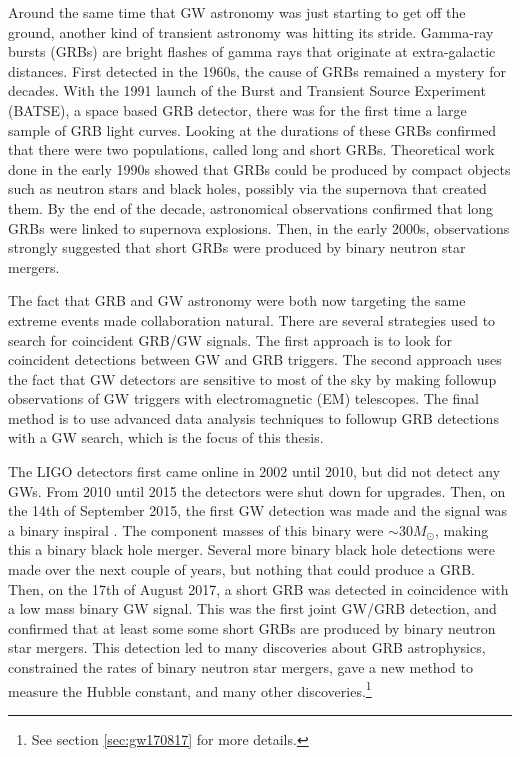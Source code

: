 \documentclass[11pt]{cuthesis}
\begin{document}
Around the same time that GW astronomy was just starting to get off the ground, another kind of transient astronomy was hitting its stride. Gamma-ray bursts (GRBs) are bright flashes of gamma rays that originate at extra-galactic distances. First detected in the 1960s, the cause of GRBs remained a mystery for decades. With the 1991 launch of the Burst and Transient Source Experiment (BATSE), a space based GRB detector, there was for the first time a large sample of GRB light curves. Looking at the durations of these GRBs  confirmed that there were two populations, called long and short GRBs. Theoretical work done in the early 1990s showed that GRBs could be produced by compact objects such as neutron stars and black holes, possibly via the supernova that created them. By the end of the decade, astronomical observations confirmed that long GRBs were linked to supernova explosions. Then, in the early 2000s, observations strongly suggested that short GRBs were produced by binary neutron star mergers. 

The fact that GRB and GW astronomy were both now targeting the same extreme events made collaboration natural. There are several strategies used to search for coincident GRB/GW signals. The first approach is to look for coincident detections between GW and GRB triggers. The second approach uses the fact that GW detectors are sensitive to most of the sky by making followup observations of GW triggers with electromagnetic (EM) telescopes. The final method is to use advanced data analysis techniques to followup GRB detections with a GW search, which is the focus of this thesis. 

The LIGO detectors first came online in 2002 until 2010, but did not detect any GWs. From 2010 until 2015 the detectors were shut down for upgrades. Then, on the 14th of September 2015, the first GW detection was made and the signal was a binary inspiral \cite{150914-det-paper}. The component masses of this binary were $\sim 30M_\odot$, making this a binary black hole merger. Several more binary black hole detections were made over the next couple of years, \cite{catalog} but nothing that could produce a GRB. Then, on the 17th of August 2017, a short GRB was detected in coincidence with a low mass binary GW signal. \cite{GW170817_det} This was the first joint GW/GRB detection, and confirmed that at least some some short GRBs are produced by binary neutron star mergers. This detection led to many discoveries about GRB astrophysics, constrained the rates of binary neutron star mergers, gave a new method to measure the Hubble constant, and many other discoveries.\footnote{See section \ref{sec:gw170817} for more details.} 
\end{document}
